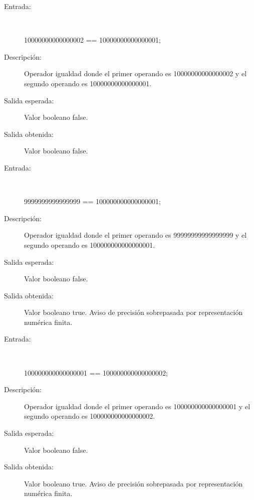 	\begin{description}
		\item [Entrada:] \hfill \\
\begin{myverbatim}
 10000000000000002 == 10000000000000001;
\end{myverbatim}
		\item [Descripción:] Operador igualdad donde el primer operando es 10000000000000002 y el segundo operando es  10000000000000001.
		\item [Salida esperada:] Valor booleano false.
		\item [Salida obtenida:] Valor booleano false.
	\end{description}

	\begin{description}
		\item [Entrada:] \hfill \\
\begin{myverbatim}
 9999999999999999 == 100000000000000001;
\end{myverbatim}
		\item [Descripción:] Operador igualdad donde el primer operando es 99999999999999999 y el segundo operando es  100000000000000001.
		\item [Salida esperada:] Valor booleano false.
		\item [Salida obtenida:] Valor booleano true.  Aviso de precisión sobrepasada por representación numérica finita.
	\end{description}

	\begin{description}
		\item [Entrada:] \hfill \\
\begin{myverbatim}
 100000000000000001 == 100000000000000002;
\end{myverbatim}
		\item [Descripción:] Operador igualdad donde el primer operando es 100000000000000001 y el segundo operando es  100000000000000002.
		\item [Salida esperada:] Valor booleano false.
		\item [Salida obtenida:] Valor booleano true.  Aviso de precisión sobrepasada por representación numérica finita.
	\end{description}

